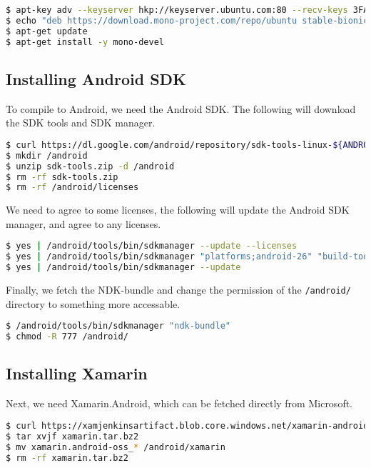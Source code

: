 \begin{lstlisting}[language=bash]
$ apt-key adv --keyserver hkp://keyserver.ubuntu.com:80 --recv-keys 3FA7E0328081BFF6A14DA29AA6A19B38D3D831EF
$ echo "deb https://download.mono-project.com/repo/ubuntu stable-bionic main" | tee /etc/apt/sources.list.d/mono-official-stable.list
$ apt-get update
$ apt-get install -y mono-devel
\end{lstlisting}

\subsection{Installing Android SDK}

To compile to Android, we need the Android SDK. The following will
download the SDK tools and SDK manager.

\begin{lstlisting}[language=bash]
$ curl https://dl.google.com/android/repository/sdk-tools-linux-${ANDROID_SDK_TOOLS_VERSION}.zip -o sdk-tools.zip
$ mkdir /android
$ unzip sdk-tools.zip -d /android
$ rm -rf sdk-tools.zip
$ rm -rf /android/licenses
\end{lstlisting}

We need to agree to some licenses, the following will update the Android
SDK manager, and agree to any licenses.

\begin{lstlisting}[language=bash]
$ yes | /android/tools/bin/sdkmanager --update --licenses
$ yes | /android/tools/bin/sdkmanager "platforms;android-26" "build-tools;27.0.3"
$ yes | /android/tools/bin/sdkmanager --update
\end{lstlisting}

Finally, we fetch the NDK-bundle and change the permission of the
\lstinline{/android/} directory to something more
accessable.

\begin{lstlisting}[language=bash]
$ /android/tools/bin/sdkmanager "ndk-bundle"
$ chmod -R 777 /android/
\end{lstlisting}

\subsection{Installing Xamarin}

Next, we need Xamarin.Android, which can be fetched directly from
Microsoft.

\begin{lstlisting}[language=bash]
$ curl https://xamjenkinsartifact.blob.core.windows.net/xamarin-android/xamarin-android/xamarin.android-oss_${XAMARIN_VERSION}.orig.tar.bz2 -o xamarin.tar.bz2
$ tar xvjf xamarin.tar.bz2
$ mv xamarin.android-oss_* /android/xamarin
$ rm -rf xamarin.tar.bz2
\end{lstlisting}

